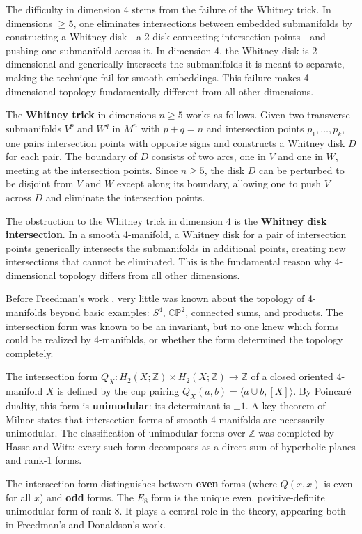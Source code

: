 The difficulty in dimension 4 stems from the failure of the Whitney trick. In dimensions $\geq 5$, one eliminates intersections between embedded submanifolds by constructing a Whitney disk---a 2-disk connecting intersection points---and pushing one submanifold across it. In dimension 4, the Whitney disk is 2-dimensional and generically intersects the submanifolds it is meant to separate, making the technique fail for smooth embeddings. This failure makes 4-dimensional topology fundamentally different from all other dimensions.

The \textbf{Whitney trick} in dimensions $n \geq 5$ works as follows. Given two transverse submanifolds $V^p$ and $W^q$ in $M^n$ with $p + q = n$ and intersection points $p_1, \ldots, p_k$, one pairs intersection points with opposite signs and constructs a Whitney disk $D$ for each pair. The boundary of $D$ consists of two arcs, one in $V$ and one in $W$, meeting at the intersection points. Since $n \geq 5$, the disk $D$ can be perturbed to be disjoint from $V$ and $W$ except along its boundary, allowing one to push $V$ across $D$ and eliminate the intersection points.

The obstruction to the Whitney trick in dimension 4 is the \textbf{Whitney disk intersection}. In a smooth 4-manifold, a Whitney disk for a pair of intersection points generically intersects the submanifolds in additional points, creating new intersections that cannot be eliminated. This is the fundamental reason why 4-dimensional topology differs from all other dimensions.

Before Freedman's work \cite{freedman1982}, very little was known about the topology of 4-manifolds beyond basic examples: $S^4$, $\mathbb{CP}^2$, connected sums, and products. The intersection form was known to be an invariant, but no one knew which forms could be realized by 4-manifolds, or whether the form determined the topology completely.

The intersection form $Q_X: H_2(X;\mathbb{Z}) \times H_2(X;\mathbb{Z}) \to \mathbb{Z}$ of a closed oriented 4-manifold $X$ is defined by the cup pairing $Q_X(a,b) = \langle a \cup b, [X] \rangle$. By Poincaré duality, this form is \textbf{unimodular}: its determinant is $\pm 1$. A key theorem of Milnor states that intersection forms of smooth 4-manifolds are necessarily unimodular. The classification of unimodular forms over $\mathbb{Z}$ was completed by Hasse and Witt: every such form decomposes as a direct sum of hyperbolic planes and rank-1 forms.

The intersection form distinguishes between \textbf{even} forms (where $Q(x,x)$ is even for all $x$) and \textbf{odd} forms. The $E_8$ form is the unique even, positive-definite unimodular form of rank 8. It plays a central role in the theory, appearing both in Freedman's and Donaldson's work.


